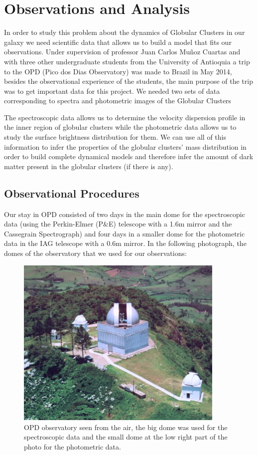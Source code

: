
\chapter{Observations and Analysis}

In order to study this problem about the dynamics of Globular Clusters in our galaxy we need scientific data that allows us to build a model that fits our observations. Under supervision of professor Juan Carlos Mu\~noz Cuartas and with three other undergraduate students from the University of Antioquia a trip to the OPD (Pico dos Dias Observatory) was made to Brazil in May 2014, besides the observational experience of the students, the main purpose of the trip was to get important data for this project. We needed two sets of data corresponding to spectra and photometric images of the Globular Clusters

The spectroscopic data allows us to determine the velocity dispersion profile in the inner region of globular clusters while the photometric data allows us to study the surface brightness distribution for them. We can use all of this information to infer the properties of the globular clusters' mass distribution in order to build complete dynamical models and therefore infer the amount of dark matter present in the globular clusters (if there is any).

\section{Observational Procedures}

Our stay in OPD consisted of two days in the main dome for the spectroscopic data (using the Perkin-Elmer (P\&E) telescope with a 1.6m mirror and the Cassegrain Spectrograph) and four days in a smaller dome for the photometric data in the IAG telescope with a 0.6m mirror. In the following photograph, the domes of the observatory that we used for our observations:

\begin{figure}[H]
\centering
\includegraphics[width=10cm]{images/opd.jpg}
\caption[OPD Observatory]{OPD observatory seen from the air, the big dome was used for the spectroscopic data and the small dome at the low right part of the photo for the photometric data.}
\end{figure}

